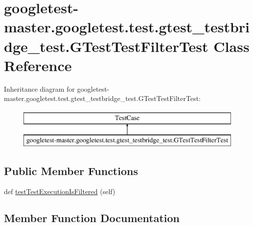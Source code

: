 \hypertarget{classgoogletest-master_1_1googletest_1_1test_1_1gtest__testbridge__test_1_1_g_test_test_filter_test}{}\section{googletest-\/master.googletest.\+test.\+gtest\+\_\+testbridge\+\_\+test.\+G\+Test\+Test\+Filter\+Test Class Reference}
\label{classgoogletest-master_1_1googletest_1_1test_1_1gtest__testbridge__test_1_1_g_test_test_filter_test}
Inheritance diagram for googletest-\/master.googletest.\+test.\+gtest\+\_\+testbridge\+\_\+test.\+G\+Test\+Test\+Filter\+Test\+:\begin{figure}[H]
\begin{center}
\leavevmode
\includegraphics[height=2.000000cm]{d8/d28/classgoogletest-master_1_1googletest_1_1test_1_1gtest__testbridge__test_1_1_g_test_test_filter_test}
\end{center}
\end{figure}
\subsection*{Public Member Functions}
\begin{DoxyCompactItemize}
\item 
def \mbox{\hyperlink{classgoogletest-master_1_1googletest_1_1test_1_1gtest__testbridge__test_1_1_g_test_test_filter_test_ab53529e850aea4e7b7ba3228312a1d35}{test\+Test\+Execution\+Is\+Filtered}} (self)
\end{DoxyCompactItemize}


\subsection{Member Function Documentation}
\mbox{\label{classgoogletest-master_1_1googletest_1_1test_1_1gtest__testbridge__test_1_1_g_test_test_filter_test_ab53529e850aea4e7b7ba3228312a1d35}} 

